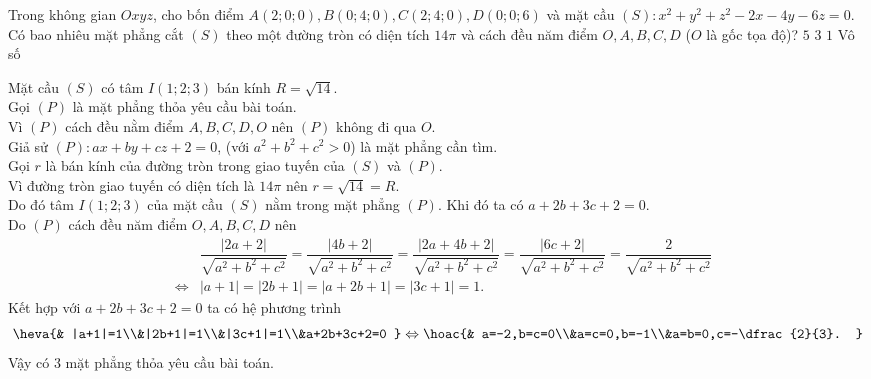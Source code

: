 \begin{ex}%
	Trong không gian $Oxyz$, cho bốn điểm $A(2;0;0),B(0;4;0),C(2;4;0),D(0;0;6)$ và mặt cầu $(S)\colon x^2+y^2+z^2-2x-4y-6z=0$. Có bao nhiêu mặt phẳng cắt $(S)$ theo một đường tròn có diện tích $14\pi$ và cách đều năm điểm $O,A,B,C,D$ ($O$ là gốc tọa độ)?
	\choice
	{$5$}
	{\True  $3$}
	{$1$}
	{Vô số}
	\loigiai
	{
		Mặt cầu $(S)$ có tâm $I(1;2;3)$ bán kính $R=\sqrt{14}$.\\
		Gọi $(P)$ là mặt phẳng thỏa yêu cầu bài toán.\\
		Vì $(P)$ cách đều nằm điểm $A,B,C,D,O$ nên $(P)$ không đi qua $O$.\\
		Giả sử $(P)\colon ax+by+cz+2=0$, (với $a^2+b^2+c^2>0$) là mặt phẳng cần tìm.\\
		Gọi $r$ là bán kính của đường tròn trong giao tuyến của $(S)$ và $(P)$.\\
		Vì đường tròn giao tuyến có diện tích là $14\pi $ nên $r=\sqrt{14}=R$.\\
		Do đó tâm $I(1;2;3)$ của mặt cầu $(S)$ nằm trong mặt phẳng $(P)$. Khi đó ta có $a+2b+3c+2=0$.\\
		Do $(P)$ cách đều năm điểm $O,A,B,C,D$ nên
		\begin{eqnarray*}
			&&\dfrac{|2a+2|}{\sqrt{a^2+b^2+c^2}}=\dfrac{|4b+2|}{\sqrt{a^2+b^2+c^2}}=\dfrac{|2a+4b+2|}{\sqrt{a^2+b^2+c^2}}=\dfrac{|6c+2|}{\sqrt{a^2+b^2+c^2}}=\dfrac{2}{\sqrt{a^2+b^2+c^2}}\\
			&\Leftrightarrow &|a+1|=|2b+1|=|a+2b+1|=|3c+1|=1.
		\end{eqnarray*}
		Kết hợp với $a+2b+3c+2=0$ ta có hệ phương trình
		$$\heva{& |a+1|=1\\&|2b+1|=1\\&|3c+1|=1\\&a+2b+3c+2=0 }\Leftrightarrow\hoac{& a=-2,b=c=0\\&a=c=0,b=-1\\&a=b=0,c=-\dfrac{2}{3}. }$$
		Vậy có $3$ mặt phẳng thỏa yêu cầu bài toán.
		
	}
\end{ex}
